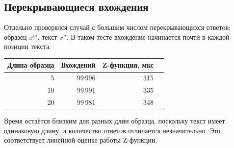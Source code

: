 \subsection{Перекрывающиеся вхождения}

Отдельно проверялся случай с большим числом перекрывающихся ответов: образец \(x^m\), текст \(x^n\).
В таком тесте вхождение начинается почти в каждой позиции текста.

\begin{center}
\begin{tabular}{|r|r|r|r|}
\hline
\rowcolor{lightgray}
Длина образца & Вхождений & Z-функция, мкс\\
\hline
5 & 99\,996 & 315 \\
\hline
10 & 99\,991 & 335 \\
\hline
20 & 99\,981 & 348 \\
\hline
\end{tabular}
\end{center}

Время остаётся близким для разных длин образца, поскольку текст имеет одинаковую длину, а количество
ответов отличается незначительно. Это соответствует линейной оценке работы Z-функции.
\pagebreak
